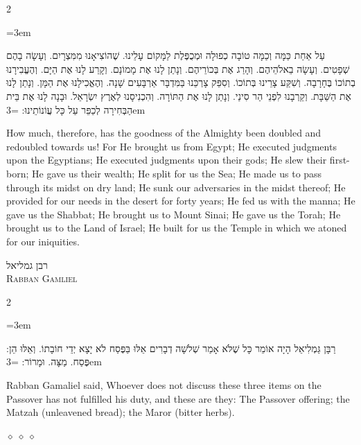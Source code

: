 \documentclass[11pt, openany]{book}
\newcommand{\sederdivider}{%
  \par\vspace{6pt}
  \begin{center}
    \textcolor{sedergold}{\pgfornament[width=1.5cm]{11}}
  \end{center}
  \par\vspace{6pt}
}
\newenvironment{bilingual}{%
  \par\vspace{4pt}%
  \begin{paracol}{2}%
}{%
  \end{paracol}%
  \par\vspace{2pt}%
}
\newenvironment{hebrewcol}{%
  \switchcolumn[1]%
  \begingroup
  \RTL
  \hebrewfont\large
  \setstretch{1.4}%
  \emergencystretch=3em
  \tolerance=9999
  \parindent=0pt\relax
}{%
  \endRTL
  \endgroup
}
\newenvironment{englishcol}{%
  \switchcolumn[0]%
  \begingroup
  \setstretch{1.4}%
  \emergencystretch=3em
  \tolerance=9999
  \normalsize
  \rightskip=0.12in\relax
}{%
  \endgroup
}
\newcommand{\parasep}{%
  \par\vspace{3pt}
  \begin{center}
    \textcolor{sedergold!50}{\tiny$\diamond\;\diamond\;\diamond$}
  \end{center}
  \par\vspace{3pt}
}
\newcommand{\subsedertitle}[2]{%
  \par\vspace{8pt}
  \begin{center}
    {\hebrewfontsanslarge\textcolor{sederblue}{\beginR #1\endR}}\\[3pt]
    {\normalsize\scshape\textcolor{sederblue}{#2}}
  \end{center}
  \par\vspace{3pt}
}
\begin{document}
\begin{bilingual}
\begin{hebrewcol}
עַל אַחַת כַּמָּה וְכַמָּה טוֹבָה כְפוּלָה וּמְכֻפֶּלֶת לַמָּקוֹם עָלֵינוּ. שֶׁהוֹצִיאָנוּ מִמִּצְרָיִם. וְעָשָׂה בָהֶם שְׁפָטִים. וְעָשָׂה בֵאלֹהֵיהֶם. וְהָרַג אֶת בְּכוֹרֵיהֶם. וְנָתַן לָנוּ אֶת מָמוֹנָם. וְקָרַע לָנוּ אֶת הַיָּם. וְהֶעֱבִירָנוּ בְתוֹכוֹ בֶּחָרָבָה. וְשִׁקַּע צָרֵינוּ בְּתוֹכוֹ. וְסִפֵּק צָרְכֵּנוּ בַּמִּדְבָּר אַרְבָּעִים שָׁנָה. וְהֶאֱכִילָנוּ אֶת הַמָּן. וְנָתַן לָנוּ אֶת הַשַּׁבָּת. וְקֵרְבָנוּ לִפְנֵי הַר סִינַי. וְנָתַן לָנוּ אֶת הַתּוֹרָה. וְהִכְנִיסָנוּ לְאֶרֶץ יִשְׂרָאֵל. וּבָנָה לָנוּ אֶת בֵּית הַבְּחִירָה לְכַפֵּר עַל כָּל עֲוֹנוֹתֵינוּ:
\end{hebrewcol}
\begin{englishcol}
How much, therefore, has the goodness of the Almighty been doubled and redoubled towards us! For He brought us from Egypt; He executed judgments upon the Egyptians; He executed judgments upon their gods; He slew their first-born; He gave us their wealth; He split for us the Sea; He made us to pass through its midst on dry land; He sunk our adversaries in the midst thereof; He provided for our needs in the desert for forty years; He fed us with the manna; He gave us the Shabbat; He brought us to Mount Sinai; He gave us the Torah; He brought us to the Land of Israel; He built for us the Temple in which we atoned for our iniquities.
\end{englishcol}
\end{bilingual}
\sederdivider

\subsedertitle{רבן גמליאל}{Rabban Gamliel}

\begin{bilingual}
\begin{hebrewcol}
רַבָּן גַּמְלִיאֵל הָיָה אוֹמֵר כָּל שֶׁלֹּא אָמַר שְׁלֹשָׁה דְבָרִים אֵלּוּ בַּפֶּסַח לֹא יָצָא יְדֵי חוֹבָתוֹ. וְאֵלּוּ הֵן: פֶּסַח. מַצָּה. וּמָרוֹר:
\end{hebrewcol}
\begin{englishcol}
Rabban Gamaliel said, Whoever does not discuss these three items on the Passover has not fulfilled his duty, and these are they: The Passover offering; the Matzah (unleavened bread); the Maror (bitter herbs).
\end{englishcol}
\end{bilingual}
\parasep
\end{document}
